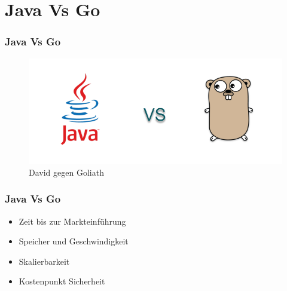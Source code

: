 \documentclass{beamer}
\begin{document}
\section{Java Vs Go}
\begin{frame}
\frametitle{Java Vs Go}

\centering
\begin{figure}
\includegraphics[scale=0.5]{javaVsGo.png}
\caption{David gegen Goliath}
\end{figure}

\end{frame}

\begin{frame}
\frametitle{Java Vs Go}

\begin{itemize}
\setlength{\itemsep}{20pt}
\item Zeit bis zur Markteinführung
\item Speicher und Geschwindigkeit
\item Skalierbarkeit
\item Kostenpunkt Sicherheit
\end{itemize}

\end{frame}
\end{document}
